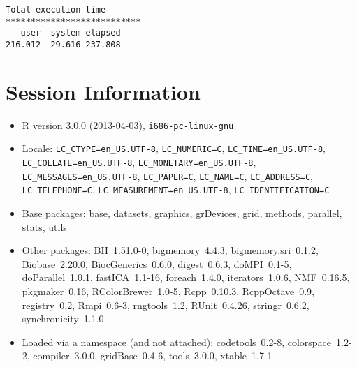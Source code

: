 \documentclass[10pt]{article}
\begin{document}
\begin{verbatim}
Total execution time
***************************
   user  system elapsed 
216.012  29.616 237.808 

\end{verbatim}

\section*{Session Information}
\begin{itemize}\raggedright
  \item R version 3.0.0 (2013-04-03), \verb|i686-pc-linux-gnu|
  \item Locale: \verb|LC_CTYPE=en_US.UTF-8|, \verb|LC_NUMERIC=C|, \verb|LC_TIME=en_US.UTF-8|, \verb|LC_COLLATE=en_US.UTF-8|, \verb|LC_MONETARY=en_US.UTF-8|, \verb|LC_MESSAGES=en_US.UTF-8|, \verb|LC_PAPER=C|, \verb|LC_NAME=C|, \verb|LC_ADDRESS=C|, \verb|LC_TELEPHONE=C|, \verb|LC_MEASUREMENT=en_US.UTF-8|, \verb|LC_IDENTIFICATION=C|
  \item Base packages: base, datasets, graphics, grDevices, grid,
    methods, parallel, stats, utils
  \item Other packages: BH~1.51.0-0, bigmemory~4.4.3,
    bigmemory.sri~0.1.2, Biobase~2.20.0, BiocGenerics~0.6.0,
    digest~0.6.3, doMPI~0.1-5, doParallel~1.0.1, fastICA~1.1-16,
    foreach~1.4.0, iterators~1.0.6, NMF~0.16.5, pkgmaker~0.16,
    RColorBrewer~1.0-5, Rcpp~0.10.3, RcppOctave~0.9, registry~0.2,
    Rmpi~0.6-3, rngtools~1.2, RUnit~0.4.26, stringr~0.6.2,
    synchronicity~1.1.0
  \item Loaded via a namespace (and not attached): codetools~0.2-8,
    colorspace~1.2-2, compiler~3.0.0, gridBase~0.4-6, tools~3.0.0,
    xtable~1.7-1
\end{itemize}
\end{document}
